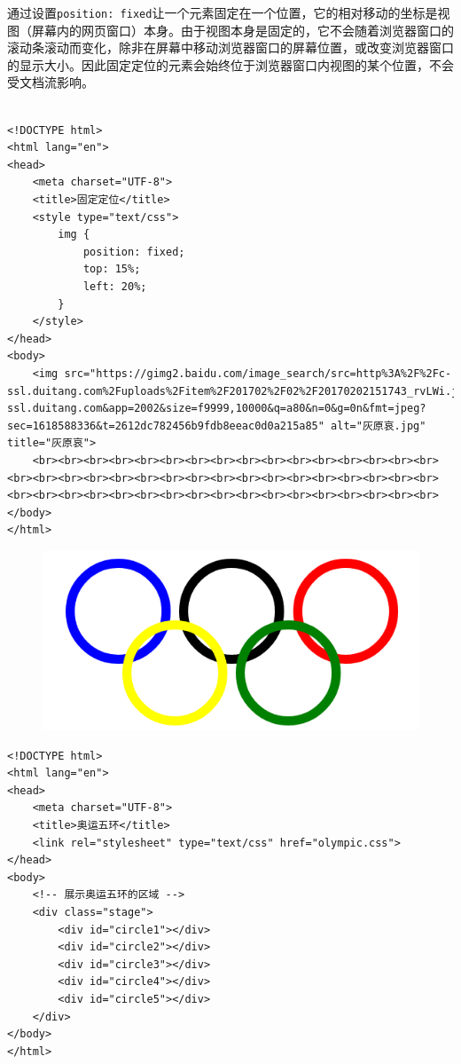 通过设置\lstinline|position: fixed|让一个元素固定在一个位置，它的相对移动的坐标是视图（屏幕内的网页窗口）本身。由于视图本身是固定的，它不会随着浏览器窗口的滚动条滚动而变化，除非在屏幕中移动浏览器窗口的屏幕位置，或改变浏览器窗口的显示大小。因此固定定位的元素会始终位于浏览器窗口内视图的某个位置，不会受文档流影响。 \\

 \\

\begin{lstlisting}[style=htmlcssjs, breaklines=true, breakatwhitespace=false]
<!DOCTYPE html>
<html lang="en">
<head>
    <meta charset="UTF-8">
    <title>固定定位</title>
    <style type="text/css">
        img {
            position: fixed;
            top: 15%;
            left: 20%;
        }
    </style>
</head>
<body>
    <img src="https://gimg2.baidu.com/image_search/src=http%3A%2F%2Fc-ssl.duitang.com%2Fuploads%2Fitem%2F201702%2F02%2F20170202151743_rvLWi.jpeg&refer=http%3A%2F%2Fc-ssl.duitang.com&app=2002&size=f9999,10000&q=a80&n=0&g=0n&fmt=jpeg?sec=1618588336&t=2612dc782456b9fdb8eeac0d0a215a85" alt="灰原哀.jpg" title="灰原哀">
    <br><br><br><br><br><br><br><br><br><br><br><br><br><br><br><br><br><br><br><br><br><br><br><br><br><br><br><br><br><br><br><br><br><br><br><br><br><br><br><br><br><br><br><br><br><br><br><br><br><br>
</body>
</html>
\end{lstlisting}

\vspace{0.5cm}


\begin{figure}[H]
	\centering
	\includegraphics[scale=0.7]{img/C8/8-4/1.png}
\end{figure}

\begin{lstlisting}[style=htmlcssjs, title=olympic.html]
<!DOCTYPE html>
<html lang="en">
<head>
    <meta charset="UTF-8">
    <title>奥运五环</title>
    <link rel="stylesheet" type="text/css" href="olympic.css">
</head>
<body>
    <!-- 展示奥运五环的区域 -->
    <div class="stage">
        <div id="circle1"></div>
        <div id="circle2"></div>
        <div id="circle3"></div>
        <div id="circle4"></div>
        <div id="circle5"></div>
    </div>
</body>
</html>
\end{lstlisting}

